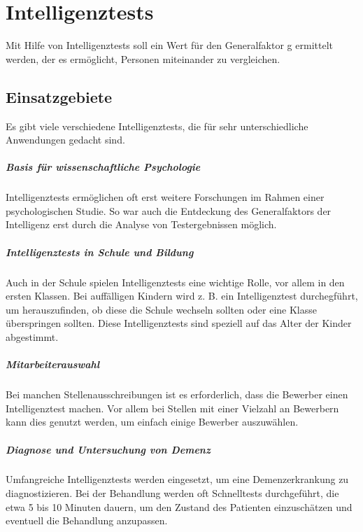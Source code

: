 \chapter{Intelligenztests}
Mit Hilfe von Intelligenztests soll ein Wert für den Generalfaktor g ermittelt werden, der es ermöglicht, Personen miteinander zu vergleichen.

\section{Einsatzgebiete}
Es gibt viele verschiedene Intelligenztests, die für sehr unterschiedliche Anwendungen gedacht sind.

\paragraph{Basis für wissenschaftliche Psychologie}
Intelligenztests ermöglichen oft erst weitere Forschungen im Rahmen einer psychologischen Studie. So war auch die Entdeckung des Generalfaktors der Intelligenz erst durch die Analyse von Testergebnissen möglich.

\paragraph{Intelligenztests in Schule und Bildung}
Auch in der Schule spielen Intelligenztests eine wichtige Rolle, vor allem in den ersten Klassen. Bei auffälligen Kindern wird z. B. ein Intelligenztest durchegführt, um herauszufinden, ob diese die Schule wechseln sollten oder eine Klasse überspringen sollten. Diese Intelligenztests sind speziell auf das Alter der Kinder abgestimmt.

\paragraph{Mitarbeiterauswahl}
Bei manchen Stellenausschreibungen ist es erforderlich, dass die Bewerber einen Intelligenztest machen. Vor allem bei Stellen mit einer Vielzahl an Bewerbern kann dies genutzt werden, um einfach einige Bewerber auszuwählen.

\paragraph{Diagnose und Untersuchung von Demenz}
Umfangreiche Intelligenztests werden eingesetzt, um eine Demenzerkrankung zu diagnostizieren. Bei der Behandlung werden oft Schnelltests durchgeführt, die etwa 5 bis 10 Minuten dauern, um den Zustand des Patienten einzuschätzen und eventuell die Behandlung anzupassen.
\cite{geok15}

